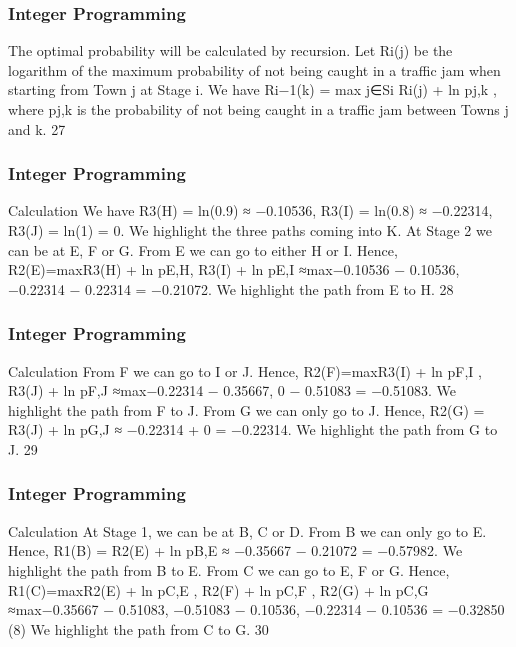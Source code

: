 \begin{frame} 
\frametitle{Integer Programming}  
The optimal probability will be calculated by recursion. Let Ri(j)
be the logarithm of the maximum probability of not being caught
in a traffic jam when starting from Town j at Stage i. We have
Ri−1(k) = max
j∈Si
{Ri(j) + ln pj,k },
where pj,k is the probability of not being caught in a traffic jam
between Towns j and k.
27 
\end{frame}  
\begin{frame} \frametitle{Integer Programming}     
Calculation
We have R3(H) = ln(0.9) ≈ −0.10536,
R3(I) = ln(0.8) ≈ −0.22314, R3(J) = ln(1) = 0.
We highlight the three paths coming into K.
At Stage 2 we can be at E, F or G. From E we can go to either H
or I. Hence,
R2(E)=max{R3(H) + ln pE,H, R3(I) + ln pE,I }
≈max{−0.10536 − 0.10536, −0.22314 − 0.22314} = −0.21072.
We highlight the path from E to H.
28 \end{frame}  \begin{frame} \frametitle{Integer Programming}     
Calculation
From F we can go to I or J. Hence,
R2(F)=max{R3(I) + ln pF,I
, R3(J) + ln pF,J }
≈max{−0.22314 − 0.35667, 0 − 0.51083} = −0.51083.
We highlight the path from F to J.
From G we can only go to J. Hence,
R2(G) = R3(J) + ln pG,J ≈ −0.22314 + 0 = −0.22314.
We highlight the path from G to J.
29 \end{frame}  \begin{frame} \frametitle{Integer Programming}     
Calculation
At Stage 1, we can be at B, C or D. From B we can only go to E.
Hence,
R1(B) = R2(E) + ln pB,E ≈ −0.35667 − 0.21072 = −0.57982.
We highlight the path from B to E.
From C we can go to E, F or G. Hence,
R1(C)=max{R2(E) + ln pC,E , R2(F) + ln pC,F , R2(G) + ln pC,G }
≈max{−0.35667 − 0.51083, −0.51083 − 0.10536,
−0.22314 − 0.10536} = −0.32850 (8)
We highlight the path from C to G.
30 
\end{frame}  

